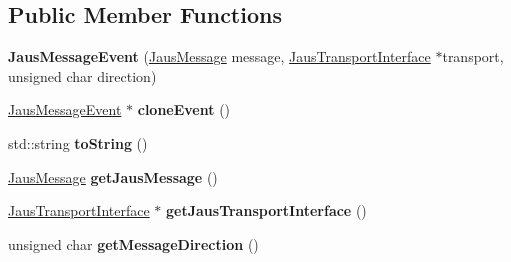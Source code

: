 \subsection*{\-Public \-Member \-Functions}
\begin{DoxyCompactItemize}
\item 
\hypertarget{class_jaus_message_event_a723153a4f1391cc74a81645aa8984370}{{\bfseries \-Jaus\-Message\-Event} (\hyperlink{struct_jaus_message_struct}{\-Jaus\-Message} message, \hyperlink{class_jaus_transport_interface}{\-Jaus\-Transport\-Interface} $\ast$transport, unsigned char direction)}\label{class_jaus_message_event_a723153a4f1391cc74a81645aa8984370}

\item 
\hypertarget{class_jaus_message_event_aa89f293f4b563f213e89aa7303f7e25e}{\hyperlink{class_jaus_message_event}{\-Jaus\-Message\-Event} $\ast$ {\bfseries clone\-Event} ()}\label{class_jaus_message_event_aa89f293f4b563f213e89aa7303f7e25e}

\item 
\hypertarget{class_jaus_message_event_a46d84475759ba7c589eb78f2d0f6ff05}{std\-::string {\bfseries to\-String} ()}\label{class_jaus_message_event_a46d84475759ba7c589eb78f2d0f6ff05}

\item 
\hypertarget{class_jaus_message_event_a1951ce43d55cb5d2b584466955293277}{\hyperlink{struct_jaus_message_struct}{\-Jaus\-Message} {\bfseries get\-Jaus\-Message} ()}\label{class_jaus_message_event_a1951ce43d55cb5d2b584466955293277}

\item 
\hypertarget{class_jaus_message_event_a07fa31094e59a8ca61a35541a212f89a}{\hyperlink{class_jaus_transport_interface}{\-Jaus\-Transport\-Interface} $\ast$ {\bfseries get\-Jaus\-Transport\-Interface} ()}\label{class_jaus_message_event_a07fa31094e59a8ca61a35541a212f89a}

\item 
\hypertarget{class_jaus_message_event_ac40cfc95e8748b069e55707cff2821bb}{unsigned char {\bfseries get\-Message\-Direction} ()}\label{class_jaus_message_event_ac40cfc95e8748b069e55707cff2821bb}

\end{DoxyCompactItemize}

